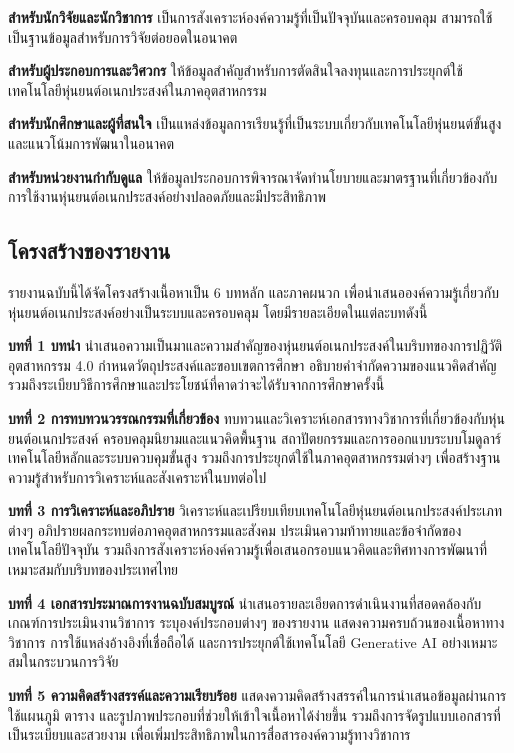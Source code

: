 \documentclass[a4paper]{article}
\begin{document}
\textbf{สำหรับนักวิจัยและนักวิชาการ} เป็นการสังเคราะห์องค์ความรู้ที่เป็นปัจจุบันและครอบคลุม สามารถใช้เป็นฐานข้อมูลสำหรับการวิจัยต่อยอดในอนาคต

\textbf{สำหรับผู้ประกอบการและวิศวกร} ให้ข้อมูลสำคัญสำหรับการตัดสินใจลงทุนและการประยุกต์ใช้เทคโนโลยีหุ่นยนต์อเนกประสงค์ในภาคอุตสาหกรรม

\textbf{สำหรับนักศึกษาและผู้ที่สนใจ} เป็นแหล่งข้อมูลการเรียนรู้ที่เป็นระบบเกี่ยวกับเทคโนโลยีหุ่นยนต์ขั้นสูงและแนวโน้มการพัฒนาในอนาคต

\textbf{สำหรับหน่วยงานกำกับดูแล} ให้ข้อมูลประกอบการพิจารณาจัดทำนโยบายและมาตรฐานที่เกี่ยวข้องกับการใช้งานหุ่นยนต์อเนกประสงค์อย่างปลอดภัยและมีประสิทธิภาพ
\subsection{โครงสร้างของรายงาน}

รายงานฉบับนี้ได้จัดโครงสร้างเนื้อหาเป็น 6 บทหลัก และภาคผนวก เพื่อนำเสนอองค์ความรู้เกี่ยวกับหุ่นยนต์อเนกประสงค์อย่างเป็นระบบและครอบคลุม โดยมีรายละเอียดในแต่ละบทดังนี้

\textbf{บทที่ 1 บทนำ} นำเสนอความเป็นมาและความสำคัญของหุ่นยนต์อเนกประสงค์ในบริบทของการปฏิวัติอุตสาหกรรม 4.0 กำหนดวัตถุประสงค์และขอบเขตการศึกษา อธิบายคำจำกัดความของแนวคิดสำคัญ รวมถึงระเบียบวิธีการศึกษาและประโยชน์ที่คาดว่าจะได้รับจากการศึกษาครั้งนี้

\textbf{บทที่ 2 การทบทวนวรรณกรรมที่เกี่ยวข้อง} ทบทวนและวิเคราะห์เอกสารทางวิชาการที่เกี่ยวข้องกับหุ่นยนต์อเนกประสงค์ ครอบคลุมนิยามและแนวคิดพื้นฐาน สถาปัตยกรรมและการออกแบบระบบโมดูลาร์ เทคโนโลยีหลักและระบบควบคุมขั้นสูง รวมถึงการประยุกต์ใช้ในภาคอุตสาหกรรมต่างๆ เพื่อสร้างฐานความรู้สำหรับการวิเคราะห์และสังเคราะห์ในบทต่อไป

\textbf{บทที่ 3 การวิเคราะห์และอภิปราย} วิเคราะห์และเปรียบเทียบเทคโนโลยีหุ่นยนต์อเนกประสงค์ประเภทต่างๆ อภิปรายผลกระทบต่อภาคอุตสาหกรรมและสังคม ประเมินความท้าทายและข้อจำกัดของเทคโนโลยีปัจจุบัน รวมถึงการสังเคราะห์องค์ความรู้เพื่อเสนอกรอบแนวคิดและทิศทางการพัฒนาที่เหมาะสมกับบริบทของประเทศไทย

\textbf{บทที่ 4 เอกสารประมาณการงานฉบับสมบูรณ์} นำเสนอรายละเอียดการดำเนินงานที่สอดคล้องกับเกณฑ์การประเมินงานวิชาการ ระบุองค์ประกอบต่างๆ ของรายงาน แสดงความครบถ้วนของเนื้อหาทางวิชาการ การใช้แหล่งอ้างอิงที่เชื่อถือได้ และการประยุกต์ใช้เทคโนโลยี Generative AI อย่างเหมาะสมในกระบวนการวิจัย

\textbf{บทที่ 5 ความคิดสร้างสรรค์และความเรียบร้อย} แสดงความคิดสร้างสรรค์ในการนำเสนอข้อมูลผ่านการใช้แผนภูมิ ตาราง และรูปภาพประกอบที่ช่วยให้เข้าใจเนื้อหาได้ง่ายขึ้น รวมถึงการจัดรูปแบบเอกสารที่เป็นระเบียบและสวยงาม เพื่อเพิ่มประสิทธิภาพในการสื่อสารองค์ความรู้ทางวิชาการ
\end{document}
